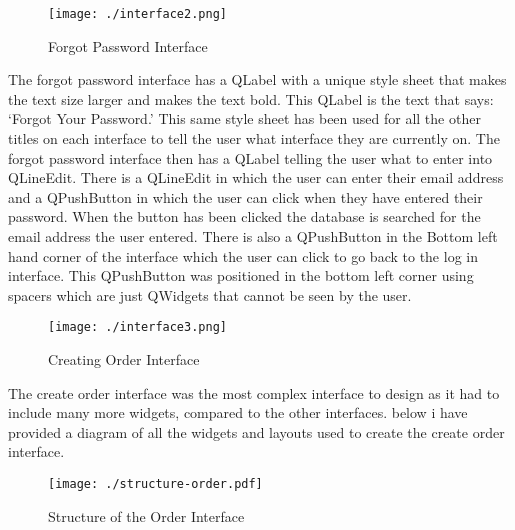 \begin{figure}[H]
    \texttt{[image: ./interface2.png]}
    \caption{Forgot Password Interface} \label{fig:forgot-password-interface}
\end{figure}

The forgot password interface has a QLabel with a unique style sheet that makes the text size larger and makes the text bold. This QLabel is the text that says: `Forgot Your Password.' This same style sheet has been used for all the other titles on each interface to tell the user what interface they are currently on. The forgot password interface then has a QLabel telling the user what to enter into QLineEdit. There is a QLineEdit in which the user can enter their email address and a QPushButton in which the user can click when they have entered their password. When the button has been clicked the database is searched for the email address the user entered. There is also a QPushButton in the Bottom left hand corner of the interface which the user can click to go back to the log in interface. This QPushButton was positioned in the bottom left corner using spacers which are just QWidgets that cannot be seen by the user.


\begin{figure}[H]
    \texttt{[image: ./interface3.png]}
    \caption{Creating Order Interface} \label{fig:creating-order-interface}
\end{figure}

The create order interface was the most complex interface to design as it had to include many more widgets, compared to the other interfaces. below i have provided a diagram of all the widgets and layouts used to create the create order interface.

\begin{figure}[H]
    \texttt{[image: ./structure-order.pdf]}
    \caption{Structure of the Order Interface} \label{fig:structure-order}
\end{figure}

